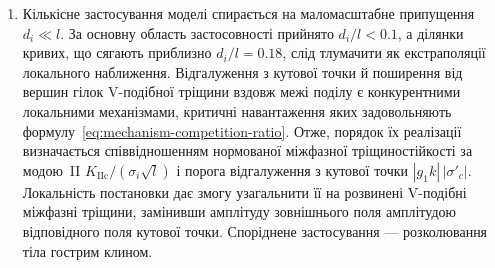 \begin{enumerate}
\item Кількісне застосування моделі спирається на маломасштабне припущення $d_i\ll l$. За основну область застосовності прийнято $d_i/l<0.1$, а ділянки кривих, що сягають приблизно $d_i/l=0.18$, слід тлумачити як екстраполяції локального наближення. Відгалуження з кутової точки й поширення від вершин гілок V-подібної тріщини вздовж межі поділу є конкурентними локальними механізмами, критичні навантаження яких задовольняють формулу~\eqref{eq:mechanism-competition-ratio}. Отже, порядок їх реалізації визначається співвідношенням нормованої міжфазної тріщиностійкості за модою~II $K_{\mathrm{IIc}}/(\sigma_i\sqrt l)$ і порога відгалуження з кутової точки $|g_1k|\,|\sigma'_c|$. Локальність постановки дає змогу узагальнити її на розвинені V-подібні міжфазні тріщини, замінивши амплітуду зовнішнього поля амплітудою відповідного поля кутової точки. Споріднене застосування — розколювання тіла гострим клином.
\end{enumerate}
